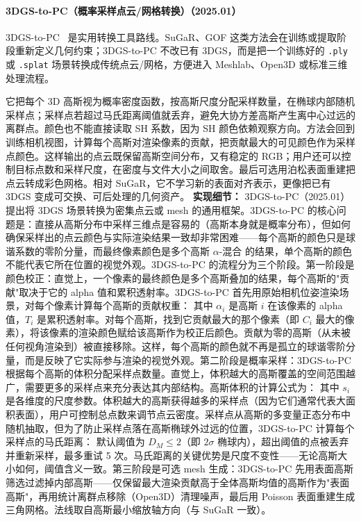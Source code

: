 \paragraph{3DGS-to-PC（概率采样点云/网格转换）（2025.01）}
3DGS-to-PC~\cite{2501_07478} 是实用转换工具路线。SuGaR、GOF 这类方法会在训练或提取阶段重新定义几何约束；3DGS-to-PC 不改已有 3DGS，而是把一个训练好的 \texttt{.ply} 或 \texttt{.splat} 场景转换成传统点云/网格，方便进入 Meshlab、Open3D 或标准三维处理流程。

它把每个 3D 高斯视为概率密度函数，按高斯尺度分配采样数量，在椭球内部随机采样点；采样点若超过马氏距离阈值就丢弃，避免大协方差高斯产生离中心过远的离群点。颜色也不能直接读取 SH 系数，因为 SH 颜色依赖观察方向。方法会回到训练相机视图，计算每个高斯对渲染像素的贡献，把贡献最大的可见颜色作为采样点颜色。这样输出的点云既保留高斯空间分布，又有稳定的 RGB；用户还可以控制目标点数和采样尺度，在密度与文件大小之间取舍。最后可选用泊松表面重建把点云转成彩色网格。相对 SuGaR，它不学习新的表面对齐表示，更像把已有 3DGS 变成可交换、可后处理的几何资产。
\textbf{实现细节：} 3DGS-to-PC（2025.01） 提出将 3DGS 场景转换为密集点云或 mesh 的通用框架。3DGS-to-PC 的核心问题是：直接从高斯分布中采样三维点是容易的（高斯本身就是概率分布），但如何确保采样出的点云颜色与实际渲染结果一致却非常困难——每个高斯的颜色只是球谐系数的零阶分量，而最终像素颜色是多个高斯 $\alpha$-混合 的结果，单个高斯的颜色不能代表它所在位置的视觉外观。3DGS-to-PC 的流程分为三个阶段。第一阶段是颜色校正：直觉上，一个像素的最终颜色是多个高斯叠加的结果，每个高斯的"贡献"取决于它的 alpha 值和累积透射率。3DGS-to-PC 首先用原始相机位姿渲染场景，对每个像素计算每个高斯的贡献权重： 其中 $\alpha_i$ 是高斯 $i$ 在该像素的 alpha 值，$T_i$ 是累积透射率。对每个高斯，找到它贡献最大的那个像素（即 $C_i$ 最大的像素），将该像素的渲染颜色赋给该高斯作为校正后颜色。贡献为零的高斯（从未被任何视角渲染到）被直接移除。这样，每个高斯的颜色就不再是孤立的球谐零阶分量，而是反映了它实际参与渲染的视觉外观。第二阶段是概率采样：3DGS-to-PC 根据每个高斯的体积分配采样点数量。直觉上，体积越大的高斯覆盖的空间范围越广，需要更多的采样点来充分表达其内部结构。高斯体积的计算公式为： 其中 $s_i$ 是各维度的尺度参数。体积越大的高斯获得越多的采样点（因为它们通常代表大面积表面），用户可控制总点数来调节点云密度。采样点从高斯的多变量正态分布中随机抽取，但为了防止采样点落在高斯椭球外过远的位置，3DGS-to-PC 计算每个采样点的马氏距离： 默认阈值为 $D_M \leq 2$（即 $2\sigma$ 椭球内），超出阈值的点被丢弃并重新采样，最多重试 5 次。马氏距离的关键优势是尺度不变性——无论高斯大小如何，阈值含义一致。第三阶段是可选 mesh 生成：3DGS-to-PC 先用表面高斯筛选过滤掉内部高斯——仅保留最大渲染贡献高于全体高斯均值的高斯作为"表面高斯"，再用统计离群点移除（Open3D）清理噪声，最后用 Poisson 表面重建生成三角网格。法线取自高斯最小缩放轴方向（与 SuGaR 一致）。
